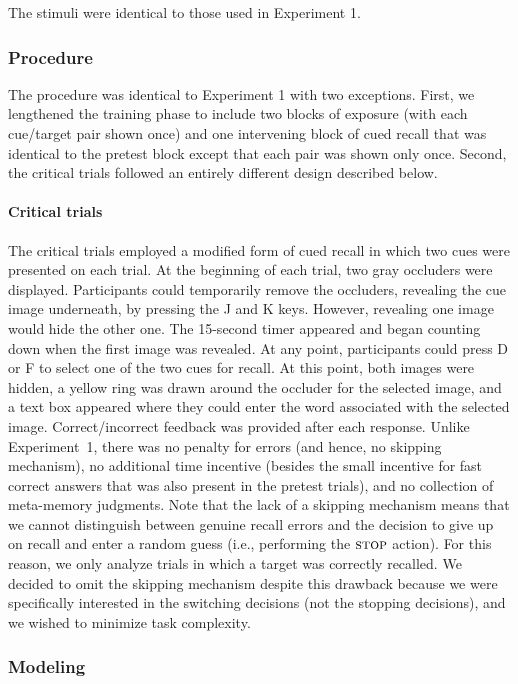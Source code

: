The stimuli were identical to those used in Experiment 1.

\subsubsection{Procedure}

The procedure was identical to Experiment 1 with two exceptions. First, we lengthened the training phase to include two blocks of exposure (with each cue/target pair shown once) and one intervening block of cued recall that was identical to the pretest block except that each pair was shown only once. Second, the critical trials followed an entirely different design described below.

\paragraph{Critical trials} The critical trials employed a modified form of cued recall in which two cues were presented on each trial. At the beginning of each trial, two gray occluders were displayed. Participants could temporarily remove the occluders, revealing the cue image underneath, by pressing the J and K keys. However, revealing one image would hide the other one. The 15-second timer appeared and began counting down when the first image was revealed. At any point, participants could press D or F to select one of the two cues for recall. At this point, both images were hidden, a yellow ring was drawn around the occluder for the selected image, and a text box appeared where they could enter the word associated with the selected image. Correct/incorrect feedback was provided after each response. Unlike Experiment~1, there was no penalty for errors (and hence, no skipping mechanism), no additional time incentive (besides the small incentive for fast correct answers that was also present in the pretest trials), and no collection of meta-memory judgments. Note that the lack of a skipping mechanism means that we cannot distinguish between genuine recall errors and the decision to give up on recall and enter a random guess (i.e., performing the $\textsc{stop}$ action). For this reason, we only analyze trials in which a target was correctly recalled. We decided to omit the skipping mechanism despite this drawback because we were specifically interested in the switching decisions (not the stopping decisions), and we wished to minimize task complexity.


\subsubsection{Modeling}

